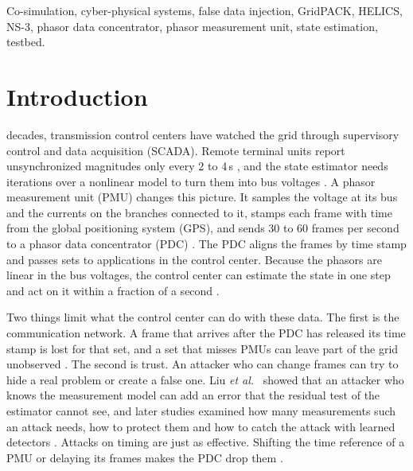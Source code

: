 \documentclass[journal]{IEEEtran}
\begin{document}
\begin{IEEEkeywords}
Co-simulation, cyber-physical systems, false data injection, GridPACK, HELICS, NS-3, phasor data concentrator, phasor measurement unit, state estimation, testbed.
\end{IEEEkeywords}

\section{Introduction}
\label{sec:intro}

 decades, transmission control centers have watched the grid through supervisory control and data acquisition (SCADA). Remote terminal units report unsynchronized magnitudes only every 2 to 4\,s \cite{doe2016synchrophasor}, and the state estimator needs iterations over a nonlinear model to turn them into bus voltages \cite{abur2004se}. A phasor measurement unit (PMU) changes this picture. It samples the voltage at its bus and the currents on the branches connected to it, stamps each frame with time from the global positioning system (GPS), and sends 30 to 60 frames per second to a phasor data concentrator (PDC) \cite{phadke2008,c37118_1}. The PDC aligns the frames by time stamp and passes sets to applications in the control center. Because the phasors are linear in the bus voltages, the control center can estimate the state in one step and act on it within a fraction of a second \cite{phadke2008,abur2004se}.

Two things limit what the control center can do with these data. The first is the communication network. A frame that arrives after the PDC has released its time stamp is lost for that set, and a set that misses PMUs can leave part of the grid unobserved \cite{c37244,pourramezan2021pdc}. The second is trust. An attacker who can change frames can try to hide a real problem or create a false one. Liu \emph{et al.}~\cite{liu2009fdi} showed that an attacker who knows the measurement model can add an error that the residual test of the estimator cannot see, and later studies examined how many measurements such an attack needs, how to protect them and how to catch the attack with learned detectors \cite{kosut2011,bobba2010,chen2022datadriven,bhattacharjee2023deep}. Attacks on timing are just as effective. Shifting the time reference of a PMU or delaying its frames makes the PDC drop them \cite{zadsar2023preventing,shereen2024topology}.
\end{document}
